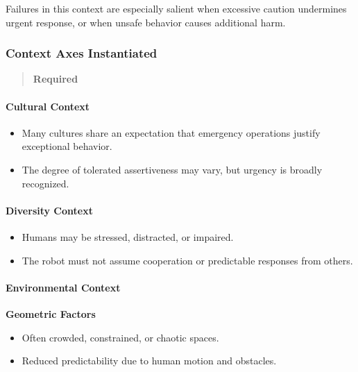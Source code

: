 \documentclass[utf8]{frontiers_suppmat} %
\providecommand{\tightlist}{%
  \setlength{\itemsep}{0pt}\setlength{\parskip}{0pt}}
\begin{document}
Failures in this context are especially salient when excessive caution
undermines urgent response, or when unsafe behavior causes additional
harm.

\subsubsection{Context Axes
Instantiated}\label{context-axes-instantiated}

\begin{quote}
\textbf{Required}
\end{quote}

\paragraph{Cultural Context}\label{cultural-context}

\begin{itemize}
\tightlist
\item
  Many cultures share an expectation that emergency operations justify
  exceptional behavior.
\item
  The degree of tolerated assertiveness may vary, but urgency is broadly
  recognized.
\end{itemize}

\paragraph{Diversity Context}\label{diversity-context}

\begin{itemize}
\tightlist
\item
  Humans may be stressed, distracted, or impaired.
\item
  The robot must not assume cooperation or predictable responses from
  others.
\end{itemize}

\paragraph{Environmental Context}\label{environmental-context}

\textbf{Geometric Factors}

\begin{itemize}
\tightlist
\item
  Often crowded, constrained, or chaotic spaces.
\item
  Reduced predictability due to human motion and obstacles.
\end{itemize}
\end{document}
